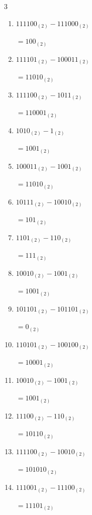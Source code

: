\begin{multicols}{3}
\begin{enumerate}
        $=11111_{(2)}$

  \item $111100_{(2)} - 111000_{(2)}$

        $=100_{(2)}$

  \item $111101_{(2)} - 100011_{(2)}$

        $=11010_{(2)}$

  \item $111100_{(2)} - 1011_{(2)}$

        $=110001_{(2)}$

  \item $1010_{(2)} - 1_{(2)}$

        $=1001_{(2)}$

  \item $100011_{(2)} - 1001_{(2)}$

        $=11010_{(2)}$

  \item $10111_{(2)} - 10010_{(2)}$

        $=101_{(2)}$

  \item $1101_{(2)} - 110_{(2)}$

        $=111_{(2)}$

\columnbreak %

  \item $10010_{(2)} - 1001_{(2)}$

        $=1001_{(2)}$

  \item $101101_{(2)} - 101101_{(2)}$

        $=0_{(2)}$

  \item $110101_{(2)} - 100100_{(2)}$

        $=10001_{(2)}$

  \item $10010_{(2)} - 1001_{(2)}$

        $=1001_{(2)}$

  \item $11100_{(2)} - 110_{(2)}$

        $=10110_{(2)}$

  \item $111100_{(2)} - 10010_{(2)}$

        $=101010_{(2)}$

  \item $111001_{(2)} - 11100_{(2)}$

        $=11101_{(2)}$


\end{enumerate}
\end{multicols}
